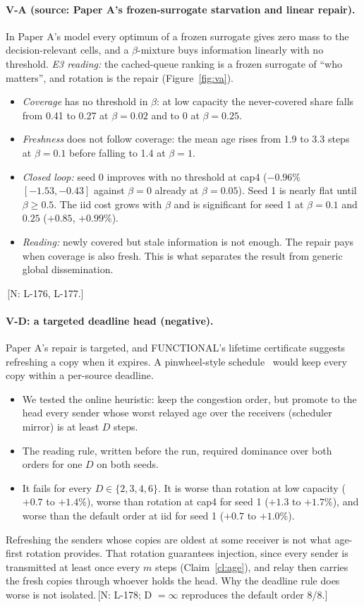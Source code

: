\documentclass[11pt]{article}
\theoremstyle{definition}
\newif\ifshownotes\shownotestrue
\newcommand{\NOTE}[1]{\ifshownotes{\color{notecol}\,\textsf{\footnotesize[N: #1]}}\fi}
\begin{document}
\paragraph{V-A (source: Paper A's frozen-surrogate starvation and linear repair).} In Paper A's model every optimum of a
frozen surrogate gives zero mass to the decision-relevant cells, and a $\beta$-mixture buys information linearly with no
threshold. \emph{E3 reading:} the cached-queue ranking is a frozen surrogate of ``who matters'', and rotation is the
repair (Figure~\ref{fig:va}).
\begin{itemize}
\item \emph{Coverage} has no threshold in $\beta$: at low capacity the never-covered share falls from 0.41 to 0.27 at
$\beta=0.02$ and to 0 at $\beta=0.25$.
\item \emph{Freshness} does not follow coverage: the mean age rises from 1.9 to 3.3 steps at $\beta=0.1$ before falling to
1.4 at $\beta=1$.
\item \emph{Closed loop:} seed 0 improves with no threshold at cap4 ($-0.96\%$ $[-1.53,-0.43]$ against $\beta=0$ already at
$\beta=0.05$). Seed 1 is nearly flat until $\beta\ge0.5$. The iid cost grows with $\beta$ and is significant for seed 1 at
$\beta=0.1$ and $0.25$ ($+0.85$, $+0.99\%$).
\item \emph{Reading:} newly covered but stale information is not enough. The repair pays when coverage is also fresh.
This is what separates the result from generic global dissemination.
\end{itemize}
\NOTE{L-176, L-177.}

\paragraph{V-D: a targeted deadline head (negative).}\label{sec:vd} Paper A's repair is targeted, and FUNCTIONAL's
lifetime certificate suggests refreshing a copy when it expires. A pinwheel-style schedule~\cite{kawamura2024} would
keep every copy within a per-source deadline.
\begin{itemize}
\item We tested the online heuristic: keep the congestion order, but promote to the head every sender whose worst relayed
age over the receivers (scheduler mirror) is at least $D$ steps.
\item The reading rule, written before the run, required dominance over both orders for one $D$ on both seeds.
\item It fails for every $D\in\{2,3,4,6\}$. It is worse than rotation at low capacity ($+0.7$ to $+1.4\%$), worse than
rotation at cap4 for seed 1 ($+1.3$ to $+1.7\%$), and worse than the default order at iid for seed 1 ($+0.7$ to $+1.0\%$).
\end{itemize}
Refreshing the senders whose copies are oldest at some receiver is not what age-first rotation provides. That
rotation guarantees injection, since every sender is transmitted at least once every $m$ steps (Claim~\ref{cl:age}),
and relay then carries the fresh copies through whoever holds the head. Why the deadline rule does worse is not
isolated.\NOTE{L-178; D $=\infty$ reproduces
the default order 8/8.}
\end{document}
